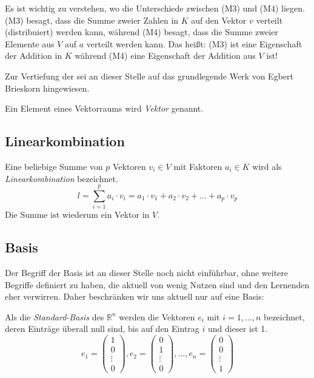 Es ist wichtig zu verstehen, wo die Unterschiede zwischen (M3) und (M4) liegen. (M3) besagt, dass die Summe zweier Zahlen in $K$ auf den Vektor $v$ verteilt (distribuiert) werden kann, während (M4) besagt, dass die Summe zweier Elemente aus $V$ auf $a$ verteilt werden kann. Das heißt: (M3) ist eine Eigenschaft der Addition in $K$ während (M4) eine Eigenschaft der Addition aus $V$ ist! 

\begin{svgraybox}
Zur Vertiefung der sei an dieser Stelle auf das grundlegende Werk von Egbert Brieskorn \cite{Brieskorn1} hingewiesen. 
\end{svgraybox}

\begin{definition}
Ein Element eines Vektorraums wird \textsl{Vektor} genannt.
\end{definition}

\subsection{Linearkombination}

\begin{definition}
Eine beliebige Summe von $p$ Vektoren $v_i \in V$ mit Faktoren $a_i \in K$ wird als \textsl{Linearkombination} bezeichnet.
\[
l = \sum_{i=1}^{p} a_i \cdot v_i = a_1\cdot v_1 + a_2 \cdot v_2 + \dots + a_p \cdot v_p
\]
Die Summe ist wiederum ein Vektor in $V$.

\end{definition}

\subsection{Basis}

Der Begriff der Basis ist an dieser Stelle noch nicht einführbar, ohne weitere Begriffe definiert zu haben, die aktuell von wenig Nutzen sind und den Lernenden eher verwirren. Daher beschränken wir uns aktuell nur auf eine Basis:

\begin{definition}
Als die \textsl{Standard-Basis} des $\mathbb{R}^n$ werden die Vektoren $e_i$ mit $i=1,\dots,n$ bezeichnet, deren Einträge überall null sind, bis auf den Eintrag $i$ und dieser ist 1. 
\begin{equation}
e_1 = \begin{pmatrix}
1\\
0\\
\vdots \\
0
\end{pmatrix}, e_2 = \begin{pmatrix}
0\\
1\\
\vdots \\
0
\end{pmatrix}, \dots, e_n = \begin{pmatrix}
0\\
0\\
\vdots \\
1
\end{pmatrix}
\end{equation}
\end{definition}

